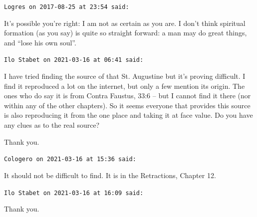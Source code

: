 \begin{footnotesize}
\begin{sffamily}
\hfill

\texttt{Logres on 2017-08-25 at 23:54 said:}

It's possible you're right: I am not as certain as you are. I don't think spiritual formation (as you say) is quite so straight forward: a man may do great things, and ``lose his own soul''.

\hfill

\texttt{Ilo Stabet on 2021-03-16 at 06:41 said:}

I have tried finding the source of that St. Augustine but it's proving difficult. I find it reproduced a lot on the internet, but only a few mention its origin. The ones who do say it is from Contra Faustus, 33:6 -- but I cannot find it there (nor within any of the other chapters). So it seems everyone that provides this source is also reproducing it from the one place and taking it at face value. Do you have any clues as to the real source?

Thank you.

\hfill

\texttt{Cologero on 2021-03-16 at 15:36 said:}

It should not be difficult to find. It is in the Retractions, Chapter 12.

\hfill

\texttt{Ilo Stabet on 2021-03-16 at 16:09 said:}

Thank you.


\hfill

\end{sffamily}
\end{footnotesize}

